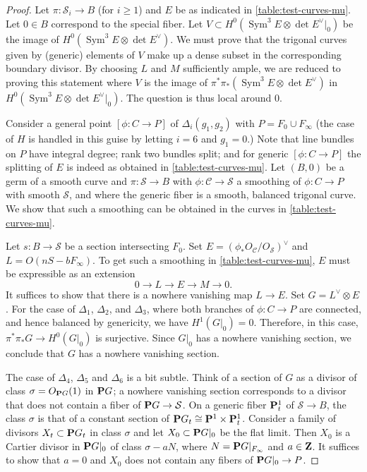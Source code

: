 \documentclass{amsart}
\newcommand {\Z}{{\bf Z}}
\renewcommand {\P}{{\bf P}}
\newcommand {\from}{{\colon}}
\newcommand{\orb}[1]{{\mathcal #1}}     %
\newcommand{\dual}[1]{#1^{\vee}}
\DeclareMathOperator{\Sym}{Sym}
\begin{document}
\begin{proof}
  Let $\pi \from \orb S_i \to B$ (for $i \geq 1$) and $E$ be as
  indicated in \autoref{table:test-curves-mu}. Let $0 \in B$
  correspond to the special fiber. Let $V \subset H^0(\Sym^3 E \otimes
  \dual {\det E}|_0)$ be the image of $H^0(\Sym^3 E \otimes \dual{\det
  E})$. We must prove that the trigonal curves given by (generic)
  elements of $V$ make up a dense subset in the corresponding boundary
  divisor. By choosing $L$ and $M$ sufficiently ample, we are reduced
  to proving this statement where $V$ is the image of $\pi^*\pi_*
  (\Sym^3 E \otimes \dual{\det E})$ in $H^0(\Sym^3 E \otimes \dual{\det E}|_0)$.
  The question is thus local around $0$.
  
  Consider a general point $[\phi \from C \to P]$ of
  $\Delta_i(g_1,g_2)$ with $P = F_0 \cup F_\infty$ (the case of $H$ is handled in this guise by letting $i = 6$ and $g_1 = 0$.) Note that line bundles on $P$ have integral degree; rank two bundles split; and for generic $[\phi \from C \to P]$ the splitting of $E$ is indeed as obtained in \autoref{table:test-curves-mu}. Let $(B,0)$ be a germ of a smooth curve and $\pi \from \orb S \to B$ with $\phi \from \orb C \to \orb S$ a smoothing of $\phi \from C \to P$ with smooth $\orb S$, and where the generic fiber is a smooth, balanced trigonal curve. We show that such a smoothing can be obtained in the curves in \autoref{table:test-curves-mu}.

  Let $s \from B \to \orb S$ be a section intersecting $F_0$. Set $E =
  \dual{(\phi_* O_{\orb C}/O_{\orb S})}$ and $L = O(nS -
  bF_\infty)$. To get such a smoothing in
  \autoref{table:test-curves-mu}, $E$ must be expressible as an
  extension
  \[ 0 \to L \to E \to M \to 0.\]
  It suffices to show that there is a nowhere vanishing map $L \to E$. Set $G = \dual L \otimes E$. For the case of $\Delta_1$, $\Delta_2$, and $\Delta_3$, where both branches of $\phi \from C \to P$ are connected, and hence balanced by genericity, we have $H^1(G|_0) = 0$. Therefore, in this case, $\pi^*\pi_*G \to H^0(G|_0)$ is surjective. Since $G|_0$ has a nowhere vanishing section, we conclude that $G$ has a nowhere vanishing section.

The case of $\Delta_4$, $\Delta_5$ and $\Delta_6$ is a bit subtle. Think of a section of $G$ as a divisor of class $\sigma = O_{\P G}(1)$ in $\P G$; a nowhere vanishing section corresponds to a divisor that does not contain a fiber of $\P G \to \orb S$. On a generic fiber $\P^1_t$ of $\orb S \to B$, the class $\sigma$ is that of a constant section of $\P G_t \cong \P^1 \times \P_t^1$. Consider a family of divisors $X_t \subset \P G_t$ in class $\sigma$ and let $X_0 \subset \P G|_0$ be the flat limit. Then $X_0$ is a Cartier divisor in $\P G|_0$ of class $\sigma - aN$, where $N = \P G|_{F_\infty}$ and $a \in \Z$. It suffices to show that $a = 0$ and $X_0$ does not contain any fibers of $\P G|_0 \to P$. 


\end{proof}
\end{document}
